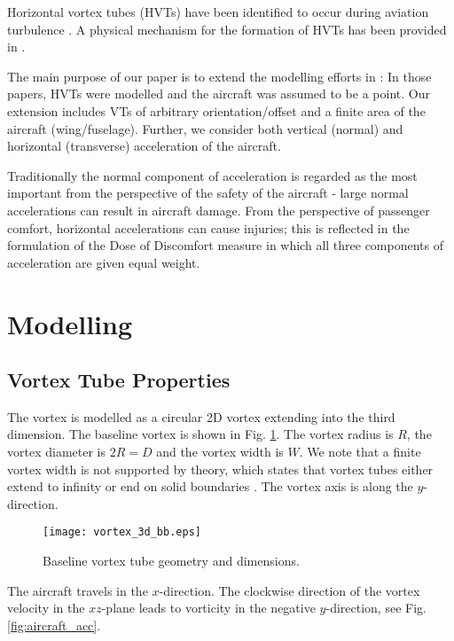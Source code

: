 \documentclass[smallextended]{svjour3}       %
\begin{document}
Horizontal vortex tubes (HVTs) have been identified to occur during aviation turbulence \citep{clark_a}. A physical mechanism for the formation of HVTs has been provided in \citep{roach_a,kaplan_a}.

The main purpose of our paper is to extend the modelling efforts in \citep{parks_a,mehta_a}: In those papers, HVTs were modelled and the aircraft was assumed to be a point. Our extension includes VTs of arbitrary orientation/offset and a finite area of the aircraft (wing/fuselage). Further, we consider both vertical (normal) and horizontal (transverse) acceleration of the aircraft.

Traditionally the normal component of acceleration is regarded as the most important from the perspective of the safety of the aircraft - large normal accelerations can result in aircraft damage. From the perspective of passenger comfort, horizontal accelerations can cause injuries; this is reflected in the formulation of the Dose of Discomfort measure \citep{jacobson_a} in which all three components of acceleration are given equal weight.

\section{Modelling}

\subsection{Vortex Tube Properties}

The vortex is modelled as a circular 2D vortex extending into the third dimension. The baseline vortex is shown in Fig. \ref{fig:baseline_vortex}. The vortex radius is $R$, the vortex diameter is $2R=D$ and the vortex width is $W$. We note that a finite vortex width is not supported by theory, which states that vortex tubes either extend to infinity or end on solid boundaries \citep{saffman_a}. The vortex axis is along the $y$-direction.

\begin{figure}
\texttt{[image: vortex\_3d\_bb.eps]}
\caption{Baseline vortex tube geometry and dimensions.}
\label{fig:baseline_vortex}
\end{figure}

The aircraft travels in the $x$-direction. The clockwise direction of the vortex velocity in the $xz$-plane leads to vorticity in the negative $y$-direction, see Fig. \ref{fig:aircraft_acc}.
\end{document}
